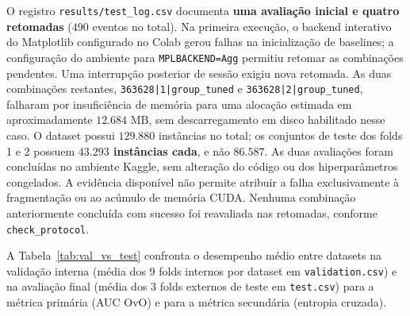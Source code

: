 \documentclass[11pt,a4paper]{article}
\begin{document}
O registro \texttt{results/test\_log.csv} documenta \textbf{uma avaliação inicial e quatro retomadas} ($490$ eventos no total). Na primeira execução, o backend interativo do Matplotlib configurado no Colab gerou falhas na inicialização de baselines; a configuração do ambiente para \texttt{MPLBACKEND=Agg} permitiu retomar as combinações pendentes. Uma interrupção posterior de sessão exigiu nova retomada. As duas combinações restantes, \texttt{363628|1|group\_tuned} e \texttt{363628|2|group\_tuned}, falharam por insuficiência de memória para uma alocação estimada em aproximadamente $12.684\text{ MB}$, sem descarregamento em disco habilitado nesse caso. O dataset possui $129.880$ instâncias no total; os conjuntos de teste dos folds 1 e 2 possuem \textbf{$43.293$ instâncias cada}, e não $86.587$. As duas avaliações foram concluídas no ambiente Kaggle, sem alteração do código ou dos hiperparâmetros congelados. A evidência disponível não permite atribuir a falha exclusivamente à fragmentação ou ao acúmulo de memória CUDA. Nenhuma combinação anteriormente concluída com sucesso foi reavaliada nas retomadas, conforme \texttt{check\_protocol}.

A Tabela~\ref{tab:val_vs_test} confronta o desempenho médio entre datasets na validação interna (média dos 9 folds internos por dataset em \texttt{validation.csv}) e na avaliação final (média dos 3 folds externos de teste em \texttt{test.csv}) para a métrica primária (AUC OvO) e para a métrica secundária (entropia cruzada).

\begin{table}[htbp]
    \centering
    \caption{Comparação entre validação interna (\texttt{results/validation.csv}, $270$ partições internas por sistema) e teste externo selado (\texttt{results/test.csv}, $90$ folds externos por sistema) nas métricas primária (AUC OvO) e secundária (entropia cruzada).}
    \label{tab:val_vs_test}
    \small
\end{table}
\end{document}
